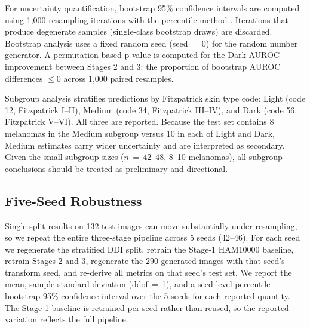 For uncertainty quantification, bootstrap 95\% confidence intervals are computed using 1{,}000 resampling iterations with the percentile method \cite{Efron1986}. Iterations that produce degenerate samples (single-class bootstrap draws) are discarded. Bootstrap analysis uses a fixed random seed (seed\,$=$\,0) for the random number generator. A permutation-based p-value is computed for the Dark AUROC improvement between Stages 2 and 3: the proportion of bootstrap AUROC differences $\leq 0$ across 1{,}000 paired resamples.

Subgroup analysis stratifies predictions by Fitzpatrick skin type code: Light (code 12, Fitzpatrick I--II), Medium (code 34, Fitzpatrick III--IV), and Dark (code 56, Fitzpatrick V--VI). All three are reported. Because the test set contains 8 melanomas in the Medium subgroup versus 10 in each of Light and Dark, Medium estimates carry wider uncertainty and are interpreted as secondary. Given the small subgroup sizes ($n\,{=}\,42$--$48$, 8--10 melanomas), all subgroup conclusions should be treated as preliminary and directional.

\subsection{Five-Seed Robustness}

Single-split results on 132 test images can move substantially under resampling, so we repeat the entire three-stage pipeline across 5 seeds (42--46). For each seed we regenerate the stratified DDI split, retrain the Stage-1 HAM10000 baseline, retrain Stages 2 and 3, regenerate the 290 generated images with that seed's transform seed, and re-derive all metrics on that seed's test set. We report the mean, sample standard deviation (ddof\,$=$\,1), and a seed-level percentile bootstrap 95\% confidence interval over the 5 seeds for each reported quantity. The Stage-1 baseline is retrained per seed rather than reused, so the reported variation reflects the full pipeline.
